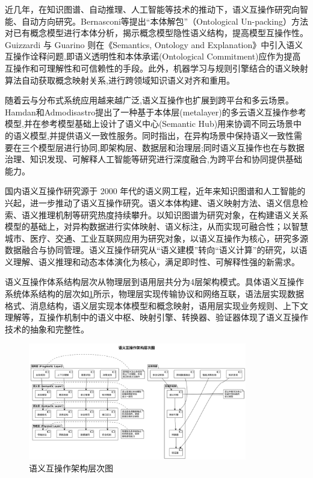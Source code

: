 近几年，在知识图谱、自动推理、人工智能等技术的推动下，语义互操作研究向智能、自动方向研究。Bernasconi等提出“本体解包”（Ontological Un-packing）方法对已有概念模型进行本体分析，揭示概念模型隐性语义结构，提高模型互操作性\cite{Guizzardi2023Explanation}。Guizzardi 与 Guarino 则在《Semantics, Ontology and Explanation》中引入语义互操作诠释问题,即语义透明性和本体承诺(Ontological Commitment)应作为提高互操作和可理解性和可信赖性的手段\cite{Guizzardi2023Explanation}。此外，机器学习与规则引擎结合的语义映射算法自动获取概念映射关系,进行跨领域知识语义对齐和重用。

随着云与分布式系统应用越来越广泛,语义互操作也扩展到跨平台和多云场景。Hamdan和Admodisastro提出了一种基于本体层(metalayer)的多云语义互操作参考模型,并在参考模型基础上设计了语义中心(Semantic Hub)用来协调不同云场景中的语义模型,并提供语义一致性服务\cite{Hamdan2023Reference,SemanticMultiCloud2024}。同时指出，在异构场景中保持语义一致性需要在三个模型层进行协同,即架构层、数据层和治理层;同时语义互操作也在与数据治理、知识发现、可解释人工智能等研究进行深度融合,为跨平台和协同提供基础能力。

国内语义互操作研究源于 2000 年代的语义网工程，近年来知识图谱和人工智能的兴起，进一步推动了语义互操作研究。语义本体构建、语义映射方法、语义信息检索、语义推理机制等研究热度持续攀升。以知识图谱为研究对象，在构建语义关系模型的基础上，对异构数据进行实体映射、语义标注，从而实现可融合性；以智慧城市、医疗、交通、工业互联网应用为研究对象，以语义互操作为核心，研究多源数据融合与协同管理。语义互操作研究从“语义建模”转向“语义计算”的研究，以语义理解、语义推理和动态本体演化为核心，满足即时性、可解释性强的新需求。

语义互操作体系结构层次从物理层到语用层共分为4层架构模式。具体语义互操作系统体系结构的层次如\ref{fig_semantic_interop_architecture}所示，物理层实现传输协议和网络互联，语法层实现数据格式、消息结构，语义层实现本体模型和概念映射，语用层实现业务规则、上下文理解等，互操作机制中的语义中枢、映射引擎、转换器、验证器体现了语义互操作技术的抽象和完整性。

\begin{figure}[H]
    \centering
    \includegraphics[width=0.85\textwidth,height=0.7\textheight,keepaspectratio]{chapters/fig-0/semantic_interop_architecture.png}
    \caption{语义互操作架构层次图}
    \label{fig_semantic_interop_architecture}
\end{figure}


